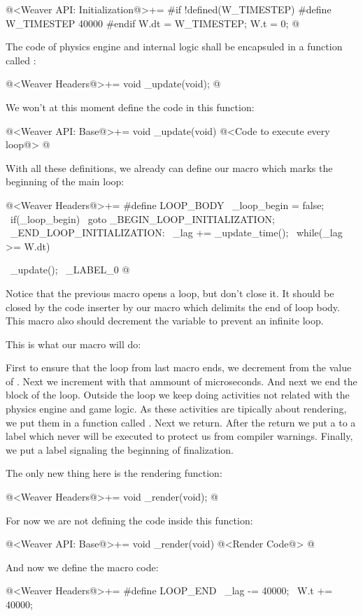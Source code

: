\iniciocodigo
@<Weaver API: Initialization@>+=
#if !defined(W_TIMESTEP)
#define W_TIMESTEP 40000
#endif
W.dt = W_TIMESTEP;
W.t = 0;
@
\fimcodigo

The code of physics engine and internal logic shall be encapsuled in a
function called :

\iniciocodigo
@<Weaver Headers@>+=
void _update(void);
@
\fimcodigo

We won't at this moment define the code in this function:

\iniciocodigo
@<Weaver API: Base@>+=
void _update(void){
  @<Code to execute every loop@>
}
@
\fimcodigo

With all these definitions, we already can define our macro which
marks the beginning of the main loop:

\iniciocodigo
@<Weaver Headers@>+=
#define LOOP_BODY                                            \
  _loop_begin =  false;                                      \
  if(_loop_begin)                                            \
    goto _BEGIN_LOOP_INITIALIZATION;                         \
_END_LOOP_INITIALIZATION:                                    \
  _lag += _update_time();                                    \
  while(_lag >= W.dt){                                       \
    _update();                                               \
_LABEL_0
@
\fimcodigo

Notice that the previous macro opens a \monoespaco{while} loop, but
don't close it. It should be closed by the code inserter by our macro
which delimits the end of loop body. This macro also should decrement
the variable \monoespaco{\_lag} to prevent an infinite loop.


This is what our macro  will do:

First to ensure that the loop from last macro ends, we decrement from
\monoespaco{\_lag} the value of \monoespaco{W.dt}. Next we increment
\monoespaco{W.t} with that ammount of microseconds. And next we end
the block of the loop. Outside the loop we keep doing activities not
related with the physics engine and game logic. As these activities
are tipically about rendering, we put them in a function called 
\monoespaco{\_render}. Next we return. After the return we put a
 to a label which never will be executed to protect us
from compiler warnings. Finally, we put a label signaling the
beginning of finalization.

The only new thing here is the rendering function:

\iniciocodigo
@<Weaver Headers@>+=
void _render(void);
@
\fimcodigo

For now we are not defining the code inside this function:

\iniciocodigo
@<Weaver API: Base@>+=
void _render(void){
  @<Render Code@>
}
@
\fimcodigo

And now we define the macro code:

\iniciocodigo
@<Weaver Headers@>+=
#define LOOP_END                                           \
    _lag -=  40000;                                        \
    W.t +=  40000;                                         \
  }                                                        \

